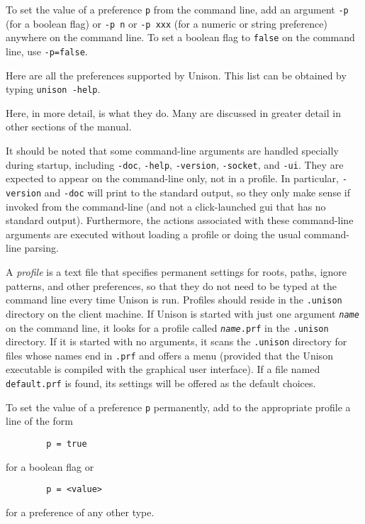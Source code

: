 \documentclass{article}
\newcommand{\ARG}[1]{\texttt{\textit{#1}}}
\begin{document}
To set the value of a preference {\tt p} from the command line, add an
argument {\tt -p} (for a boolean flag) or {\tt -p n} or {\tt -p xxx} (for
a numeric or string preference) anywhere on the command line.  To set a
boolean flag to \verb|false| on the command line, use {\tt -p=false}.

Here are all the preferences supported by Unison.  This list can be
  obtained by typing {\tt unison -help}.
\begin{quote}

\end{quote}

Here, in more detail, is what they do.  Many are discussed in greater detail
in other sections of the manual.

It should be noted that some command-line arguments are handled specially during startup, including \verb|-doc|, \verb|-help|, \verb|-version|, \verb|-socket|, and \verb|-ui|. They are expected to appear on the command-line only, not in a profile. In particular, \verb|-version| and \verb|-doc| will print to the standard output, so they only make sense if invoked from the command-line (and not a click-launched gui that has no standard output). Furthermore, the actions associated with these command-line arguments are executed without loading a profile or doing the usual command-line parsing.
%




A {\em profile} is a text file that specifies permanent settings for
roots, paths, ignore patterns, and other preferences, so that they do
not need to be typed at the command line every time Unison is run.
Profiles should reside in the \verb|.unison| directory on the client
machine.  If Unison is started with just one argument \ARG{name} on
the command line, it looks for a profile called \texttt{\ARG{name}.prf} in
the \verb|.unison| directory.  If it is started with no arguments, it
scans the \verb|.unison| directory for files whose names end in
\verb|.prf| and offers a menu (provided that the Unison executable is compiled with the graphical user interface).  If a file named \verb|default.prf| is
found, its settings will be offered as the default choices.

To set the value of a preference {\tt p} permanently, add to the
appropriate profile a line of the form
\begin{verbatim}
        p = true
\end{verbatim}
for a boolean flag or
\begin{verbatim}
        p = <value>
\end{verbatim}
for a preference of any other type.
\end{document}
